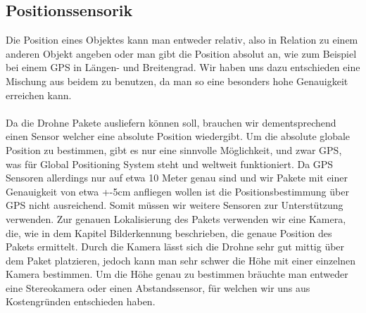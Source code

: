 \subsection{Positionssensorik}
Die Position eines Objektes kann man entweder relativ, also in Relation zu einem anderen Objekt angeben oder man gibt die Position absolut an, wie zum Beispiel bei einem GPS in Längen- und Breitengrad. Wir haben uns dazu entschieden eine Mischung aus beidem zu benutzen, da man so eine besonders hohe Genauigkeit erreichen kann.
\\
\\ Da die Drohne Pakete ausliefern können soll, brauchen wir dementsprechend einen Sensor welcher eine absolute Position wiedergibt. Um die absolute globale Position zu bestimmen, gibt es nur eine sinnvolle Möglichkeit, und zwar GPS, was für Global Positioning System steht und weltweit funktioniert. Da GPS Sensoren allerdings nur auf etwa 10 Meter genau sind und wir Pakete mit einer Genauigkeit von etwa +-5cm anfliegen wollen ist die Positionsbestimmung über GPS nicht ausreichend. Somit müssen wir weitere Sensoren zur Unterstützung verwenden. Zur genauen Lokalisierung des Pakets verwenden wir eine Kamera, die, wie in dem Kapitel Bilderkennung beschrieben, die genaue Position des Pakets ermittelt. Durch die Kamera lässt sich die Drohne sehr gut mittig über dem Paket platzieren, jedoch kann man sehr schwer die Höhe mit einer einzelnen Kamera bestimmen. Um die Höhe genau zu bestimmen bräuchte man entweder eine Stereokamera oder einen Abstandssensor, für welchen wir uns aus Kostengründen entschieden haben.


